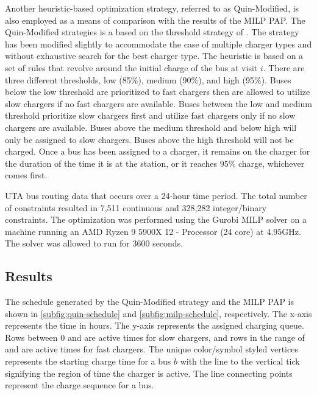 \documentclass[utf8]{FrontiersinHarvard}
\let\cite\citep                                       %
\newcommand{\fast}{15 }                                                         %
\newcommand{\slow}{15 }                                                         %
\newcommand{\contvars}{7,511 }
\newcommand{\intvars}{328,282 }
\newcommand{\timeran}{3600 }                                                    %
\begin{document}
Another heuristic-based optimization strategy, referred to as Quin-Modified, is also employed as a means of comparison
with the results of the MILP PAP. The Quin-Modified strategies is a based on the threshold strategy of
\cite{qin-2016-numer-analy}. The strategy has been modified slightly to accommodate the case of multiple charger types
and without exhaustive search for the best charger type. The heuristic is based on a set of rules that revolve around
the initial charge of the bus at visit \(i\). There are three different thresholds, low (85\%), medium (90\%), and high
(95\%). Buses below the low threshold are prioritized to fast chargers then are allowed to utilize slow chargers if no
fast chargers are available. Buses between the low and medium threshold prioritize slow chargers first and utilize fast
chargers only if no slow chargers are available. Buses above the medium threshold and below high will only be assigned
to slow chargers. Buses above the high threshold will not be charged. Once a bus has been assigned to a charger, it
remains on the charger for the duration of the time it is at the station, or it reaches 95\% charge, whichever comes
first.

UTA bus routing data that occurs over a 24-hour time period. The total number of constraints resulted in \contvars
continuous and \intvars integer/binary constraints. The optimization was performed using the Gurobi MILP solver
\cite{gurobi-2021-gurob-optim} on a machine running an AMD Ryzen 9 5900X 12 - Processor (24 core) at 4.95GHz. The
solver was allowed to run for \timeran seconds.

\subsection{Results}
\label{results}
The schedule generated by the Quin-Modified strategy and the MILP PAP is shown in \autoref{subfig:quin-schedule} and
\autoref{subfig:milp-schedule}, respectively. The x-axis represents the time in hours. The y-axis represents the
assigned charging queue. Rows between 0 and \fpeval{\slow - 1} are active times for slow chargers, and rows in the range
of \fpeval{\slow - 1} and \fpeval{\fast + \slow - 1} are active times for fast chargers. The unique color/symbol styled
vertices represents the starting charge time for a bus \(b\) with the line to the vertical tick signifying the region of
time the charger is active. The line connecting points represent the charge sequence for a bus.
\end{document}
